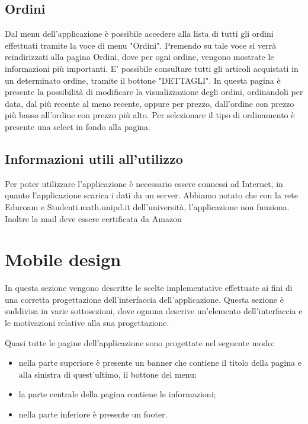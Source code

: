 \documentclass[12pt, a4paper, titlepage]{report}
\begin{document}
	\subsection{Ordini}
	Dal menu dell'applicazione è possibile accedere alla lista di tutti gli ordini effettuati tramite la voce di menu "Ordini". Premendo su tale voce si verrà reindirizzati alla pagina Ordini, dove per ogni ordine, vengono mostrate le informazioni più importanti. E' possibile consultare tutti gli articoli acquistati in un determinato ordine, tramite il bottone "DETTAGLI".
	\noindent In questa pagina è presente la possibilità di modificare la visualizzazione degli ordini, ordinandoli per data, dal più recente al meno recente, oppure per prezzo, dall'ordine con prezzo più basso all'ordine con prezzo più alto. Per selezionare il tipo di ordinamento è presente una select in fondo alla pagina.

	
	\subsection{Informazioni utili all'utilizzo}
	Per poter utilizzare l'applicazione è necessario essere connessi ad Internet, in quanto l'applicazione scarica i dati da un server. Abbiamo notato che con la rete Eduroam e Studenti.math.unipd.it dell'università, l'applicazione non funziona. Inoltre la mail deve essere certificata da Amazon 
	
	\section{Mobile design}
	In questa sezione vengono descritte le scelte implementative effettuate ai fini di una corretta progettazione dell'interfaccia dell'applicazione. Questa sezione è suddivisa in varie sottosezioni, dove ognuna descrive un'elemento dell'interfaccia e le motivazioni relative alla sua progettazione.
	
	Quasi tutte le pagine dell'applicazione sono progettate nel seguente modo:
	\begin{itemize}
		\item nella parte superiore è presente un banner che contiene il titolo della pagina e alla sinistra di quest'ultimo, il bottone del menu;
		\item la parte centrale della pagina contiene le informazioni;
		\item nella parte inferiore è presente un footer.
	\end{itemize}
	
\end{document}
